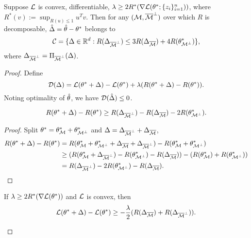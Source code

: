 \begin{pro} Suppose $\mathcal{L}$ is convex, differentiable,
    $\lambda\ge 2R^*(\nabla\mathcal{L}(\theta^*;\{z_i\}_{i=1}^n))$,
    where $R^*(v):=\sup_{R(u)\le 1}u^T v$.
    Then for any $(\mathcal{M}, {\overline{\mathcal{M}}}^\perp)$ over which $R$ is decomposable,
    ${\hat\Delta} = {\hat{\theta}} - \theta^*$ belongs to
    \begin{equation}
        \mathcal{C}=\{\Delta\in{\mathbb{R}}^d:R(\Delta_{{\overline{\mathcal{M}}}^\perp})\le 3 R(\Delta_{{\overline{\mathcal{M}}}}) + 4R(\theta^*_{\mathcal{M}^\perp})\},
    \end{equation}
    where $\Delta_{{\overline{\mathcal{M}}}^\perp}=\Pi_{{\overline{\mathcal{M}}}^\perp}(\Delta)$.
\end{pro}

\begin{proof}
    Define
    \begin{equation}
        \mathcal{D}(\Delta)=\mathcal{L}(\theta^*+\Delta)-\mathcal{L}(\theta^*)+\lambda(R(\theta^*+\Delta)-R(\theta^*)).
    \end{equation}
    Noting optimality of ${\hat{\theta}}$, we have $\mathcal{D}({\hat\Delta})\le0$.

    \begin{claim}
        \begin{equation}
            R(\theta^*+\Delta)-R(\theta^*) \ge R(\Delta_{{\overline{\mathcal{M}}}^\perp})-R(\Delta_{{\overline{\mathcal{M}}}})-2R(\theta^*_{\mathcal{M}^\perp}).
        \end{equation}
    \end{claim}

    \begin{proof}
        Split $\theta^*=\theta_{\mathcal{M}}^*+\theta^*_{\mathcal{M}^\perp}$ and $\Delta=\Delta_{{\overline{\mathcal{M}}}^\perp}+\Delta_{{\overline{\mathcal{M}}}}$,
        \begin{equation}
            \begin{split}
                R(\theta^*+\Delta) - R(\theta^*) & = R(\theta_{\mathcal{M}}^*+\theta^*_{\mathcal{M}^\perp}+\Delta_{{\overline{\mathcal{M}}}}+\Delta_{{\overline{\mathcal{M}}}^\perp}) - R(\theta_{\mathcal{M}}^*+\theta^*_{\mathcal{M}^\perp}) \\
                    & \ge (R(\theta_{\mathcal{M}}^*+\Delta_{{\overline{\mathcal{M}}}^\perp})-R(\theta^*_{\mathcal{M}^\perp}) - R(\Delta_{{\overline{\mathcal{M}}}})) - (R(\theta_{\mathcal{M}}^*) + R(\theta_{\mathcal{M}^\perp}^*))  \\
                    & = R(\Delta_{{\overline{\mathcal{M}}}^\perp})-2R(\theta^*_{\mathcal{M}^\perp}) - R(\Delta_{{\overline{\mathcal{M}}}}).
            \end{split}
        \end{equation}
    \end{proof}

    \begin{claim}
        If $\lambda\ge 2R^*(\nabla\mathcal{L}(\theta^*))$ and $\mathcal{L}$ is convex, then
        \begin{equation}
            \mathcal{L}(\theta^*+\Delta) -\mathcal{L}(\theta^*) \ge -\frac{\lambda}{2} (R(\Delta_{{\overline{\mathcal{M}}}})+R(\Delta_{{\overline{\mathcal{M}}}^\perp})).
        \end{equation}
    \end{claim}


\end{proof}
